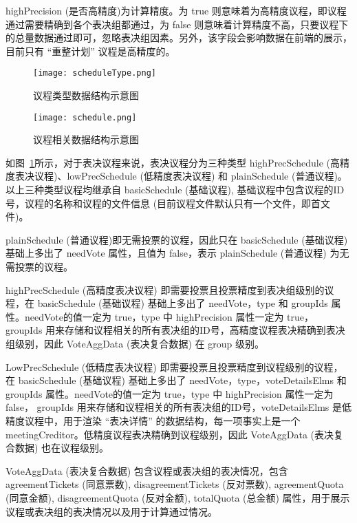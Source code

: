   highPrecision (是否高精度)为计算精度。为 true 则意味着为高精度议程，即议程通过需要精确到各个表决组都通过，为 false 则意味着计算精度不高，只要议程下的总量数据通过即可，忽略表决组因素。另外，该字段会影响数据在前端的展示，目前只有 “重整计划” 议程是高精度的。

  \begin{figure}[!htp]
    \begin{minipage}{0.44\textwidth}
      \centering
      \texttt{[image: scheduleType.png]}
      \caption{议程类型数据结构示意图}
      \label{fig:scheduleType}
    \end{minipage}\hfill
    \begin{minipage}{0.54\textwidth}
      \centering
      \texttt{[image: schedule.png]}
      \caption{议程相关数据结构示意图}
      \label{fig:schedule}
    \end{minipage}
    \end{figure}
    如图~\ref{fig:schedule}所示，对于表决议程来说，表决议程分为三种类型 highPrecSchedule (高精度表决议程)、lowPrecSchedule (低精度表决议程) 和 plainSchedule (普通议程)。以上三种类型议程均继承自 basicSchedule (基础议程), 基础议程中包含议程的ID号，议程的名称和议程的文件信息 (目前议程文件默认只有一个文件，即首文件)。

  plainSchedule (普通议程)即无需投票的议程，因此只在 basicSchedule (基础议程) 基础上多出了 needVote 属性，且值为 false，表示 plainSchedule (普通议程) 为无需投票的议程。

  highPrecSchedule (高精度表决议程) 即需要投票且投票精度到表决组级别的议程，在 basicSchedule (基础议程) 基础上多出了 needVote，type 和 groupIds 属性。needVote的值一定为 true，type 中 highPrecision 属性一定为 true， groupIds 用来存储和议程相关的所有表决组的ID号，高精度议程表决精确到表决组级别，因此 VoteAggData (表决复合数据) 在 group 级别。

  LowPrecSchedule (低精度表决议程) 即需要投票且投票精度到议程级别的议程，在 basicSchedule (基础议程) 基础上多出了 needVote，type，voteDetailsElms 和 groupIds 属性。needVote的值一定为 true，type 中 highPrecision 属性一定为 false， groupIds 用来存储和议程相关的所有表决组的ID号，voteDetailsElms 是低精度议程中，用于渲染 “表决详情” 的数据结构，每一项事实上是一个 meetingCreditor。低精度议程表决精确到议程级别，因此 VoteAggData (表决复合数据) 也在议程级别。

  VoteAggData (表决复合数据) 包含议程或表决组的表决情况，包含 agreementTickets (同意票数), disagreementTickets (反对票数), agreementQuota (同意金额), disagreementQuota (反对金额), totalQuota (总金额) 属性，用于展示议程或表决组的表决情况以及用于计算通过情况。

